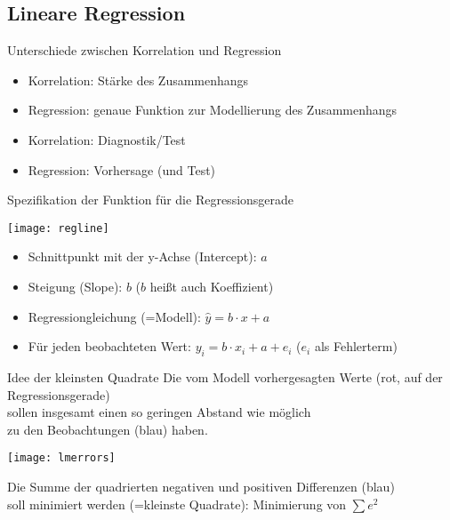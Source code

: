 \subsection{Lineare Regression}

\begin{frame}
  {Unterschiede zwischen Korrelation und Regression}
  \begin{itemize}[<+->]
    \item Korrelation: Stärke des Zusammenhangs
    \item \alert{Regression: genaue Funktion zur Modellierung des Zusammenhangs}
      \vspace{0.5cm}
    \item Korrelation: Diagnostik\slash Test
    \item \alert{Regression: Vorhersage} (und Test)
  \end{itemize}
\end{frame}

\begin{frame}
  {Spezifikation der Funktion für die Regressionsgerade}
  \vspace{-0.5cm}
  \begin{center}
    \texttt{[image: regline]}
  \end{center}
  \vspace{-0.5cm}
  \pause
  \begin{itemize}[<+->]
    \item Schnittpunkt mit der y-Achse (\alert{Intercept}): \alert{$a$}
    \item Steigung (\alert{Slope}): \alert{$b$} ($b$ heißt auch \alert{Koeffizient}) 
    \item \alert{Regressiongleichung (=Modell): $\hat{y}=b\cdot x+a$}
    \item Für jeden beobachteten Wert: \alert{$y_i=b\cdot x_i+a+e_i$} ($e_i$ als Fehlerterm)
  \end{itemize}
\end{frame}

\begin{frame}
  {Idee der kleinsten Quadrate}
  Die vom Modell vorhergesagten Werte (rot, auf der Regressionsgerade)\\
  sollen insgesamt einen so geringen Abstand wie möglich\\
  zu den Beobachtungen (blau) haben.
  \vspace{-0.5cm}
  \begin{center}
    \texttt{[image: lmerrors]}
  \end{center}
  \pause
  Die Summe der \alert{quadrierten} negativen und positiven Differenzen (blau)\\
  soll \alert{minimiert} werden (=kleinste Quadrate): Minimierung von \alert{$\sum e^2$}
\end{frame}

